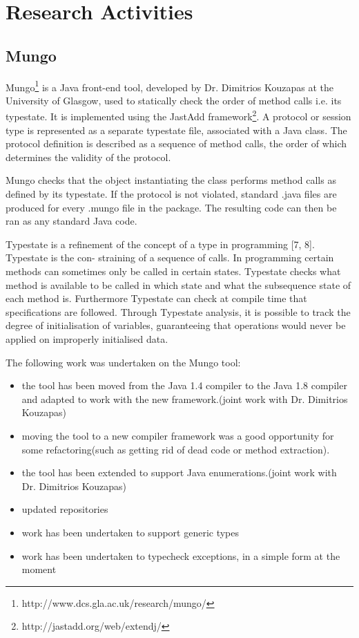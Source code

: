 \section{Research Activities}
\label{sec:Research}

\subsection{Mungo}
\label{sub:Mungo}
Mungo\footnote{http://www.dcs.gla.ac.uk/research/mungo/} is a Java front-end tool, developed by Dr. Dimitrios Kouzapas at the University of Glasgow, used to statically check the order of method calls i.e. its typestate. It is implemented using the JastAdd framework\footnote{http://jastadd.org/web/extendj/}. A protocol or session type is represented as a separate typestate file, associated with a Java class.  The protocol definition is described as a sequence of method calls, the order of which determines the validity of the protocol.

Mungo checks that the object instantiating the class performs method calls as defined by its typestate. If the protocol is not violated, standard .java files are produced for every .mungo file in the package.  The resulting code can then be ran as any standard Java code.

Typestate is a refinement of the concept of a type in programming [7, 8]. Typestate is the con- straining of a sequence of calls. In programming certain methods can sometimes only be called in certain states. Typestate checks what method is available to be called in which state and what the subsequence state of each method is. Furthermore Typestate can check at compile time that specifications are followed. Through Typestate analysis, it is possible to track the degree of initialisation of variables, guaranteeing that operations would never be applied on improperly initialised data.

The following work was undertaken on the Mungo tool:
\begin{itemize}
  \item the tool has been moved from the Java 1.4 compiler to the Java 1.8 compiler and adapted to work with the new framework.(joint work with Dr. Dimitrios Kouzapas)
  \item moving the tool to a new compiler framework was a good opportunity for some refactoring(such as getting rid of dead code or method extraction).
  \item the tool has been extended to support Java enumerations.(joint work with Dr. Dimitrios Kouzapas)
  \item updated repositories
  \item work has been undertaken to support generic types
  \item work has been undertaken to typecheck exceptions, in a simple form at the moment
\end{itemize}


